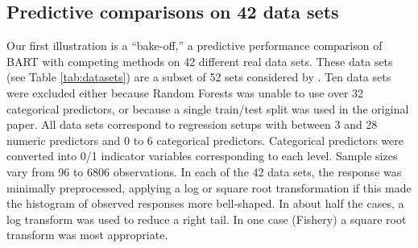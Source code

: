 \documentclass[aoas,nameyear,dvips]{arximspdf}
\newcommand{\citeasnoun}[1]{\citet{#1}}
\begin{document}
\subsection{Predictive comparisons on 42 data sets}\label{sec:bakeoff}

Our first illustration is a ``bake-off,'' a predictive
performance comparison of BART with competing methods on 42 different real data sets.
These data sets (see Table \ref{tab:datasets}) are a subset of 52 sets considered by \citeasnoun{KimLohShiCha2007}.
Ten data sets were excluded either because Random Forests was unable to use over 32
categorical predictors, or because a single train/test split was used
in the original paper.  All data sets correspond to regression setups with
between 3 and 28 numeric predictors and 0 to 6 categorical predictors.
Categorical predictors were converted into 0/1 indicator variables
corresponding to each level.  Sample sizes vary from 96 to 6806 observations.
In each of the 42 data sets, the response was minimally preprocessed,
applying a log or square root transformation if this made the histogram
of observed responses more bell-shaped.  In about half the cases, a log
transform was used to reduce a right tail.  In one case (Fishery) a square
root transform was most appropriate.
\end{document}
